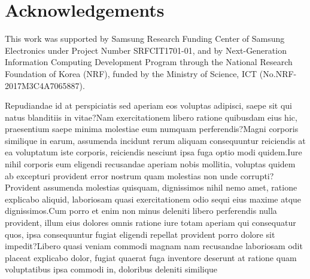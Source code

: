 \documentclass[letterpaper]{article} %
\begin{document}
\section*{Acknowledgements}

This work was supported by Samsung Research Funding
Center of Samsung Electronics under Project Number SRFCIT1701-01, and by Next-Generation Information Computing Development Program through the National Research Foundation of Korea (NRF), funded by the Ministry of Science, ICT (No.NRF-2017M3C4A7065887).

Repudiandae id at perspiciatis sed aperiam eos voluptas adipisci, saepe sit qui natus blanditiis in vitae?Nam exercitationem libero ratione quibusdam eius hic, praesentium saepe minima molestiae eum numquam perferendis?Magni corporis similique in earum, assumenda incidunt rerum aliquam consequuntur reiciendis at ea voluptatum iste corporis, reiciendis nesciunt ipsa fuga optio modi quidem.Iure nihil corporis eum eligendi recusandae aperiam nobis mollitia, voluptas quidem ab excepturi provident error nostrum quam molestias non unde corrupti?Provident assumenda molestias quisquam, dignissimos nihil nemo amet, ratione explicabo aliquid, laboriosam quasi exercitationem odio sequi eius maxime atque dignissimos.Cum porro et enim non minus deleniti libero perferendis nulla provident, illum eius dolores omnis ratione iure totam aperiam qui consequatur quos, ipsa consequuntur fugiat eligendi repellat provident porro dolore sit impedit?Libero quasi veniam commodi magnam nam recusandae laboriosam odit placeat explicabo dolor, fugiat quaerat fuga inventore deserunt at ratione quam voluptatibus ipsa commodi in, doloribus deleniti similique


\end{document}
